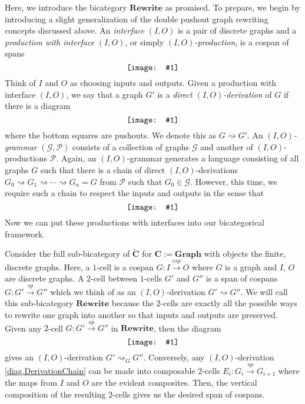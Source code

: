 \documentclass[11pt]{amsart}
\newcommand{\cat}[1]{\mathbf{#1}}
\newcommand{\from}{\colon}
\renewcommand{\span}{\xrightarrow{\mathit{sp}}}
\newcommand{\cospan}{\xrightarrow{\mathit{csp}}}
\newcommand{\csC}{\widetilde{\mathbf{C}}}
\newcommand{\diagram}[1]{\raisebox{-0.5\height}{\texttt{[image: \#1]}}}
\theoremstyle{remark}
\theoremstyle{definition}
\begin{document}
Here, we introduce the bicategory $\cat{Rewrite}$ as promised.  To prepare, we begin by introducing a slight generalization of the double pushout graph rewriting concepts discussed above.  
An \emph{interface} $(I,O)$ is a pair of discrete graphs and a \emph{production with interface} $(I,O)$, or simply \emph{$(I,O)$-production}, is a cospan of spans
\[
	\label{NoRef_IOProduction}
	\diagram{NoRef_IOProduction}
\]
Think of $I$ and $O$ as choosing inputs and outputs. Given a production with interface $(I,O)$, we say that a graph $G'$ is a \emph{direct $(I,O)$-derivation} of $G$ if there is a diagram
\[
	\label{NoRef_IODerivation}
	\diagram{NoRef_IODerivation}
\]
where the bottom squares are pushouts. We denote this as $G \rightsquigarrow G'$. An \emph{$(I,O)$-grammar} $(\mathcal{G},\mathcal{P})$ consists of a collection of graphs $\mathcal{G}$ and another of $(I,O)$-productions $\mathcal{P}$. Again, an $(I,O)$-grammar generates a language consisting of all graphs $G$ such that there is a chain of direct $(I,O)$-derivations $G_0 \rightsquigarrow G_1 \rightsquigarrow \dotsm \rightsquigarrow G_n=G$ from $\mathcal{P}$ such that $G_0 \in \mathcal{G}$. However, this time, we require such a chain to respect the inputs and outputs in the sense that 
\begin{equation}
	\label{diag.DerivationChain}
	\diagram{Diag_DerivationChain}
\end{equation}
Now we can put these productions with interfaces into our bicategorical framework.

Consider the full sub-bicategory of $\csC$ for $\cat{C} := \cat{Graph}$ with objects the finite, discrete graphs. Here, a $1$-cell is a cospan $G \from I \cospan O$ where $G$ is a graph and $I$, $O$ are discrete graphs.  A $2$-cell between $1$-cells $G'$ and $G''$ is a span of cospans $G \from G' \span G''$ which we think of as an $(I,O)$-derivation $G' \rightsquigarrow G''$.  We will call this sub-bicategory $\cat{Rewrite}$ because the $2$-cells are exactly all the possible ways to rewrite one graph into another so that inputs and outputs are preserved. Given any $2$-cell $G \from G' \span G''$ in $\cat{Rewrite}$, then the diagram 
\[
	\label{NoRef_2CellToRewrite}
	\diagram{NoRef_2CellToRewrite}
\]
gives an $(I,O)$-derivation $G' \rightsquigarrow_G G''$. Conversely, any $(I,O)$-derivation \eqref{diag.DerivationChain} can be made into composable $2$-cells $E_i \from G_i \span G_{i+1}$ where the maps from $I$ and $O$ are the evident composites. Then, the vertical composition of the resulting $2$-cells gives us the desired span of cospans.
\end{document}
